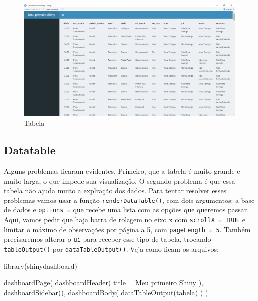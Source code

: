 \documentclass[
]{book}
\newenvironment{Shaded}{\begin{snugshade}}{\end{snugshade}}
\newcommand{\AttributeTok}[1]{\textcolor[rgb]{0.77,0.63,0.00}{#1}}
\newcommand{\FunctionTok}[1]{\textcolor[rgb]{0.00,0.00,0.00}{#1}}
\newcommand{\NormalTok}[1]{#1}
\newcommand{\StringTok}[1]{\textcolor[rgb]{0.31,0.60,0.02}{#1}}
\begin{document}
\begin{figure}
\centering
\includegraphics{./imagens/cap10imagem11.png}
\caption{Tabela}
\end{figure}

\hypertarget{datatable}{%
\subsection{Datatable}\label{datatable}}

Alguns problemas ficaram evidentes. Primeiro, que a tabela é muito grande e muito larga, o que impede sua visualização. O segundo problema é que essa tabela não ajuda muito a explração dos dados. Para tentar resolver esses problemas vamos usar a função \texttt{renderDataTable()}, com dois argumentos: a base de dados e \texttt{options\ =} que recebe uma lista com as opções que queremos passar. Aqui, vamos pedir que haja barra de rolagem no eixo x com \texttt{scrollX\ =\ TRUE} e limitar o máximo de observações por página a 5, com \texttt{pageLength\ =\ 5}. Também precisaremos alterar o \texttt{ui} para receber esse tipo de tabela, trocando \texttt{tableOutput()} por \texttt{dataTableOutput()}. Veja como ficam os arquivos:

\begin{Shaded}
\begin{Highlighting}[]
\FunctionTok{library}\NormalTok{(shinydashboard)}

\FunctionTok{dashboardPage}\NormalTok{(}
  \FunctionTok{dashboardHeader}\NormalTok{(}
    \AttributeTok{title =} \StringTok{\textquotesingle{}Meu primeiro Shiny\textquotesingle{}}
\NormalTok{  ),}
  \FunctionTok{dashboardSidebar}\NormalTok{(),}
  \FunctionTok{dashboardBody}\NormalTok{(}
    \FunctionTok{dataTableOutput}\NormalTok{(}\StringTok{\textquotesingle{}tabela\textquotesingle{}}\NormalTok{)}
\NormalTok{  )}
\NormalTok{)}
\end{Highlighting}
\end{Shaded}
\end{document}
